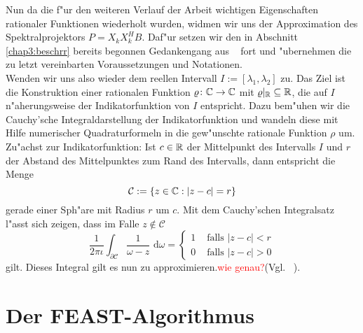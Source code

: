 Nun da die f"ur den weiteren Verlauf der Arbeit wichtigen Eigenschaften rationaler
Funktionen wiederholt wurden, widmen wir uns der Approximation des Spektralprojektors
$P = X_k X_k^H B$. Daf"ur setzen wir den in Abschnitt \ref{chap3:beschrr} bereits begonnen Gedankengang aus ~\cite{ptep}
fort und "ubernehmen die zu letzt vereinbarten Voraussetzungen und Notationen.\\

Wenden wir uns also wieder dem reellen Intervall $I := [\lambda_1, \lambda_2]$ zu. Das Ziel ist
die Konstruktion einer rationalen Funktion $\varrho\colon\mathbb{C}\to\mathbb{C}$ mit $\varrho|_{\mathbb{R}} \subseteq \mathbb{R}$,
die auf $I$ n"aherungsweise der Indikatorfunktion von $I$ entspricht. Dazu
bem"uhen wir die Cauchy'sche Integraldarstellung der Indikatorfunktion und
wandeln diese mit Hilfe numerischer Quadraturformeln in die gew"unschte
rationale Funktion $\rho$ um.\\

Zu"achst zur Indikatorfunktion: Ist $c\in\mathbb{R}$ der Mittelpunkt des Intervalls $I$ und
$r$ der Abstand des Mittelpunktes zum Rand des Intervalls, dann entspricht die Menge
\[
\mathcal{C} := \{z\in\mathbb{C} : |z-c| = r\}
\]
gerade einer Sph"are mit Radius $r$ um $c$. Mit dem Cauchy'schen Integralsatz
l"asst sich zeigen, dass im Falle $z\notin \mathcal{C}$
\[
\frac{1}{2\pi\iota}\int_{\partial \mathcal{C}}\frac{1}{\omega-z}\text{ d}\omega
= \begin{cases}1 &\text{ falls }|z-c| < r \\ 0 &\text{ falls }|z-c| > 0 \end{cases}
\]
gilt. Dieses Integral gilt es nun zu approximieren.\textcolor{red}{wie genau?}(Vgl. ~\cite[20]{jaenich}).\\



\section{Der FEAST-Algorithmus}
